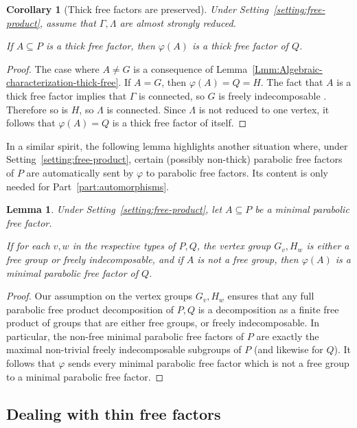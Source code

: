 \documentclass[a4paper,english,11pt]{article}
\newtheorem{lemma}[de]{Lemma}
\newtheorem{cor}[de]{Corollary}
\theoremstyle{definition}
\theoremstyle{remark}
\begin{document}
\begin{cor}[Thick free factors are preserved]\label{cor:recognizing-free-factors}
Under Setting~\ref{setting:free-product}, assume that $\Gamma,\Lambda$ are almost strongly reduced.  

If $A\subseteq P$ is a thick free factor, then $\varphi(A)$ is a thick free factor of $Q$. 
\end{cor}

\begin{proof}
The case where $A\neq G$ is a consequence of Lemma~\ref{Lmm:Algebraic-characterization-thick-free}. If $A=G$, then $\varphi(A)=Q=H$. The fact that $A$ is a thick free factor implies that $\Gamma$ is connected, so $G$ is freely indecomposable \cite[Lemma~4.7]{Gre}. Therefore so is $H$, so $\Lambda$ is connected. Since $\Lambda$ is not reduced to one vertex, it follows that $\varphi(A)=Q$ is a thick free factor of itself.
\end{proof}

In a similar spirit, the following lemma highlights another situation where, under Setting~\ref{setting:free-product}, certain (possibly non-thick) parabolic free factors of $P$ are automatically sent by $\varphi$ to parabolic free factors. Its content is only needed for Part~\ref{part:automorphisms}.
 
\begin{lemma}\label{lemma:free}
Under Setting~\ref{setting:free-product}, let $A\subseteq P$ be a minimal parabolic free factor. 
    
    If for each $v,w$ in the respective types of $P,Q$, the vertex group $G_v,H_w$ is either a free group or freely indecomposable, and if $A$ is not a free group, then $\varphi(A)$ is a minimal parabolic free factor of $Q$.
\end{lemma}

\begin{proof}
Our assumption on the vertex groups $G_v,H_w$ ensures that 
any full parabolic free product decomposition of $P,Q$ is a decomposition as a finite free product of groups that are either free groups, or freely indecomposable. In particular, the non-free minimal parabolic free factors of $P$ are exactly the maximal non-trivial freely indecomposable subgroups of $P$ (and likewise for $Q$). It follows that $\varphi$ sends every minimal parabolic free factor which is not a free group to a minimal parabolic free factor. 
\end{proof}


\subsection{Dealing with thin free factors}\label{sec:thin}
\end{document}
